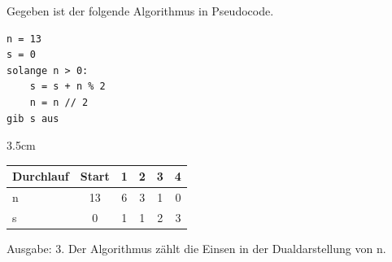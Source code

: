 \question[4]
Gegeben ist der folgende Algorithmus in Pseudocode.
\begin{lstlisting}[language={}]
n = 13
s = 0
solange n > 0:
    s = s + n % 2
    n = n // 2
gib s aus
\end{lstlisting}
\begin{solutionbox}{3.5cm}
\begin{tabular}{l|ccccc}
Durchlauf & Start & 1 & 2 & 3 & 4 \\
\hline
n & 13 & 6 & 3 & 1 & 0 \\
s & 0 & 1 & 1 & 2 & 3 \\
\end{tabular}

Ausgabe: 3. Der Algorithmus zählt die Einsen in der Dualdarstellung von n.
\end{solutionbox}
